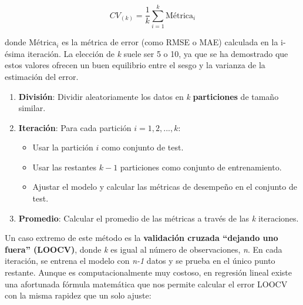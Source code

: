 \documentclass[
  letterpaper,
  DIV=11,
  numbers=noendperiod]{scrreprt}
\providecommand{\tightlist}{%
  \setlength{\itemsep}{0pt}\setlength{\parskip}{0pt}}
\begin{document}
\[CV_{(k)} = \frac{1}{k}\sum_{i=1}^{k} \text{Métrica}_i\]

donde \(\text{Métrica}_i\) es la métrica de error (como RMSE o MAE)
calculada en la i-ésima iteración. La elección de \emph{k} suele ser 5 o
10, ya que se ha demostrado que estos valores ofrecen un buen equilibrio
entre el sesgo y la varianza de la estimación del error.

\begin{tcolorbox}[enhanced jigsaw, breakable, toprule=.15mm, bottomtitle=1mm, coltitle=black, colbacktitle=quarto-callout-note-color!10!white, titlerule=0mm, opacitybacktitle=0.6, bottomrule=.15mm, toptitle=1mm, title=\textcolor{quarto-callout-note-color}{\faInfo}\hspace{0.5em}{Procedimiento de k-particiones}, arc=.35mm, rightrule=.15mm, opacityback=0, colframe=quarto-callout-note-color-frame, leftrule=.75mm, left=2mm, colback=white]

\begin{enumerate}
\def\labelenumi{\arabic{enumi}.}
\tightlist
\item
  \textbf{División}: Dividir aleatoriamente los datos en \emph{k}
  \textbf{particiones} de tamaño similar.
\item
  \textbf{Iteración}: Para cada partición \(i = 1, 2, ..., k\):

  \begin{itemize}
  \tightlist
  \item
    Usar la partición \(i\) como conjunto de test.
  \item
    Usar las restantes \(k-1\) particiones como conjunto de
    entrenamiento.
  \item
    Ajustar el modelo y calcular las métricas de desempeño en el
    conjunto de test.
  \end{itemize}
\item
  \textbf{Promedio}: Calcular el promedio de las métricas a través de
  las \emph{k} iteraciones.
\end{enumerate}

\end{tcolorbox}

Un caso extremo de este método es la \textbf{validación cruzada
``dejando uno fuera'' (LOOCV)}, donde \emph{k} es igual al número de
observaciones, \emph{n}. En cada iteración, se entrena el modelo con
\emph{n-1} datos y se prueba en el único punto restante. Aunque es
computacionalmente muy costoso, en regresión lineal existe una
afortunada fórmula matemática que nos permite calcular el error LOOCV
con la misma rapidez que un solo ajuste:
\end{document}
